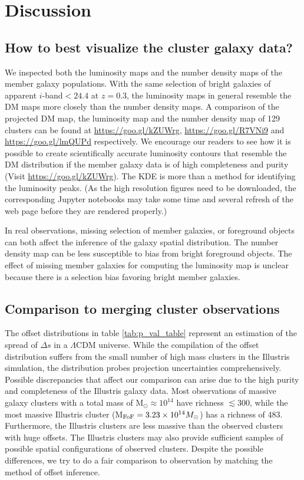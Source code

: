 \section{Discussion}\label{sec:discussion}

\subsection{How to best visualize the cluster galaxy data?}
We inspected both the luminosity maps and the
number density maps of the member galaxy populations.
With the same selection of bright galaxies of apparent $i$-band$ < 24.4$ at
$z=0.3$, the luminosity maps in general resemble the DM maps more closely than 
the number density maps.
A comparison of the projected 
DM map, the luminosity map and the number density map of 129 clusters 
can be found at \href{https://goo.gl/kZUWrg}{https://goo.gl/kZUWrg}, 
\href{https://goo.gl/R7VNi9}{https://goo.gl/R7VNi9} and
\href{https://goo.gl/lmQUPd}{https://goo.gl/lmQUPd} respectively. 
We encourage our readers to see how it is possible
to create scientifically accurate luminosity contours 
that resemble 
the DM distribution if the member galaxy
data is of high completeness and purity (Visit
\href{https://goo.gl/kZUWrg}{https://goo.gl/kZUWrg}). The KDE is more than a method for
identifying the luminosity peaks.
(As the high resolution figures need to be downloaded, the 
corresponding Jupyter notebooks may take some time and several refresh of the
web page before they are rendered properly.)

In real observations, missing selection of member galaxies, or 
foreground objects can both affect the inference of the galaxy spatial 
distribution. The number density map can be less susceptible to bias from bright 
foreground objects. The effect of missing member galaxies 
for computing the luminosity map is unclear because there is a selection bias favoring 
bright member galaxies.

\subsection{Comparison to merging cluster observations}

The offset distributions in table \ref{tab:p_val_table}
represent an estimation of the spread of $\Delta s$ in a $\Lambda$CDM universe.
While the compilation of the offset distribution suffers 
from the small number of high mass clusters in the Illustris simulation, 
the distribution probes projection uncertainties comprehensively. 
Possible discrepancies that affect our comparison can arise
due to the high purity and completeness of the Illustris galaxy data.
Most observations of massive galaxy clusters with a total mass of M$_\odot
\approx 10^{14}$ have richness $\lesssim 300$, while the most massive Illustris
cluster (M$_{\rm FoF} = 3.23 \times 10^{14} M_\odot$) has a richness of 483.
Furthermore, the Illustris clusters are less massive than the observed clusters
with huge offsets. The Illustris clusters may also provide sufficient samples
of possible spatial configurations of observed clusters.
Despite the possible differences, we try to do a
fair comparison to observation by matching the method of offset inference. 

